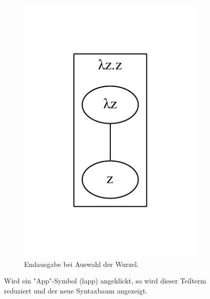 \documentclass[parskip=full,11pt,twoside]{scrartcl}
\begin{document}
\begin{figure}[H]
\begin{subfigure}{0.25\textwidth}
		\includegraphics[width=\textwidth]{img/displayTree5}
		\caption{Endausgabe bei Auswahl der Wurzel.}	
	\end{subfigure}
	\caption{Wird ein "App"-Symbol (\gls{lapp}) angeklickt, so wird dieser Teilterm reduziert und der neue Syntaxbaum angezeigt.}
\end{figure}
\end{document}
